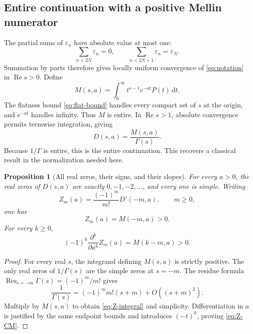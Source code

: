 \documentclass[11pt,a4paper]{article}
\numberwithin{equation}{section}
\newtheorem{proposition}[proposition]{Proposition}
\theoremstyle{definition}
\theoremstyle{remark}
\newcommand{\eps}{\varepsilon}
\newcommand{\dd}{\,\mathrm d}
\newcommand{\Rea}{\operatorname{Re}}
\begin{document}
\subsection{Entire continuation with a positive Mellin numerator}
The partial sums of $\eps_n$ have absolute value at most one:
\[
 \sum_{n<2N}\eps_n=0,\qquad
 \sum_{n<2N+1}\eps_n=\eps_N.
\]
Summation by parts therefore gives locally uniform convergence of
\cref{eq:notation} in $\Rea s>0$. Define
\begin{equation}
 M(s,a)=\int_0^\infty t^{s-1}e^{-at}P(t)\dd t.
 \label{eq:M-def}
\end{equation}
The flatness bound \cref{eq:flat-bound} handles every compact set of
$s$ at the origin, and $e^{-at}$ handles infinity. Thus $M$ is
entire. In $\Rea s>1$, absolute convergence permits termwise
integration, giving
\begin{equation}
 \boxed{D(s,a)=\frac{M(s,a)}{\Gamma(s)}.}
 \label{eq:D-continuation}
\end{equation}
Because $1/\Gamma$ is entire, this is the entire continuation.
This recovers a classical result in the normalization needed here.

\begin{proposition}[All real zeros, their signs, and their slopes]
\label{prop:real-zeros}
For every $a>0$, the real zeros of $D(s,a)$ are exactly
$0,-1,-2,\ldots$, and every one is simple. Writing
\begin{equation}
 Z_m(a)=\frac{(-1)^m}{m!}D'(-m,a),\qquad m\ge0,
 \label{eq:Z-def}
\end{equation}
one has
\begin{equation}
 \boxed{Z_m(a)=M(-m,a)>0.}
 \label{eq:Z-integral}
\end{equation}
For every $k\ge0$,
\begin{equation}
 (-1)^k\frac{\partial^k}{\partial a^k}Z_m(a)
   =M(k-m,a)>0.
 \label{eq:Z-CM}
\end{equation}
\end{proposition}
\begin{proof}
For every real $s$, the integrand defining $M(s,a)$ is strictly
positive. The only real zeros of $1/\Gamma(s)$ are the simple zeros
at $s=-m$. The residue formula
$\operatorname{Res}_{s=-m}\Gamma(s)=(-1)^m/m!$ gives
\[
 \frac1{\Gamma(s)}=(-1)^m m!(s+m)+O((s+m)^2).
\]
Multiply by $M(s,a)$ to obtain \cref{eq:Z-integral} and simplicity.
Differentiation in $a$ is justified by the same endpoint bounds and
introduces $(-t)^k$, proving \cref{eq:Z-CM}.
\end{proof}
\end{document}
